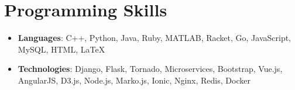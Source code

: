 \documentclass[letterpaper,11pt]{article}
\newcommand{\resumeItem}[2]{
  \item\small{
    \textbf{#1}{: #2 \vspace{-2pt}}
  }
}
\newcommand{\resumeSubItem}[2]{\resumeItem{#1}{#2}\vspace{-4pt}}
\newcommand{\resumeSubHeadingListStart}{\begin{itemize}[leftmargin=*]}
\newcommand{\resumeSubHeadingListEnd}{\end{itemize}}
\begin{document}
\section{Programming Skills}
  \resumeSubHeadingListStart
    \resumeSubItem{Languages}
      {C++, Python, Java, Ruby, MATLAB, Racket, Go, JavaScript, MySQL, HTML, \LaTeX} \\
    \resumeSubItem{Technologies}
      {Django, Flask, Tornado, Microservices, Bootstrap, Vue.js, AngularJS, D3.js, Node.js, Marko.js, Ionic, Nginx, Redis, Docker} \\
  \resumeSubHeadingListEnd


\end{document}
